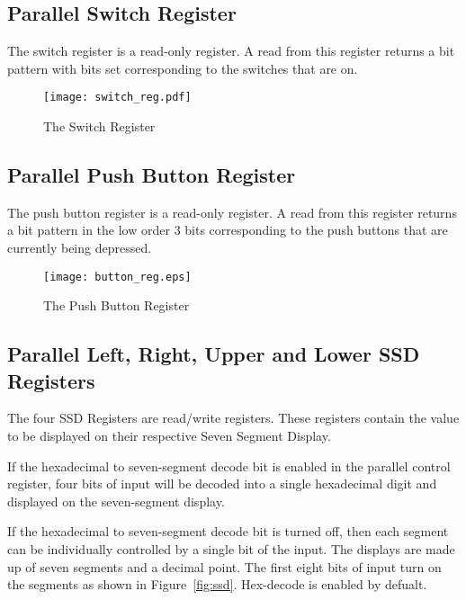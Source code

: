 \subsection{Parallel Switch Register}

The switch register is a read-only register. A read from this register
returns a bit pattern with bits set corresponding to the switches that
are on.

\begin{figure}[h]
\begin{center}
\texttt{[image: switch\_reg.pdf]}
\caption{The Switch Register}
\label{switch_reg_pic}
\end{center}
\end{figure}


\subsection{Parallel Push Button Register}

The push button register is a read-only register. A read from this
register returns a bit pattern in the low order 3 bits corresponding
to the push buttons that are currently being depressed.

\begin{figure}[h]
\begin{center}
\texttt{[image: button\_reg.eps]} %
\caption{The Push Button Register}
\label{button_reg_pic}
\end{center}
\end{figure}

\subsection{Parallel Left, Right, Upper and Lower SSD Registers}

The four SSD Registers are read/write registers. These
registers contain the value to be displayed on their respective Seven
Segment Display. 

If the hexadecimal to seven-segment decode bit is enabled in the
parallel control register, four bits of input will be decoded into a
single hexadecimal digit and displayed on the seven-segment display.

If the hexadecimal to seven-segment decode bit is turned off, then
each segment can be individually controlled by a single bit of the
input. The displays are made up of seven segments and a decimal point.
The first eight bits of input turn on the segments as shown in
Figure~\ref{fig:ssd}.
Hex-decode is enabled by defualt.

